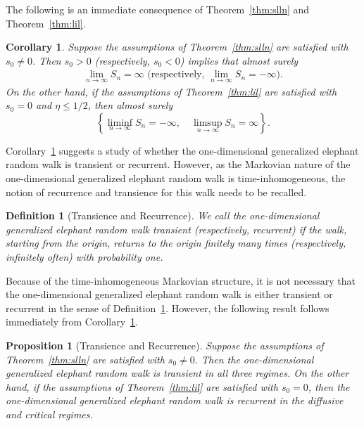 \documentclass[12pt]{amsart}
\theoremstyle{plain}
\newtheorem{corollary}[theorem]{Corollary}
\newtheorem{proposition}[theorem]{Proposition}
\newtheorem{definition}[theorem]{Definition}
\theoremstyle{remark}
\numberwithin{equation}{section}
\begin{document}
The following is an immediate consequence of Theorem~\ref{thm:slln} and Theorem~\ref{thm:lil}.

\begin{corollary}\label{cor:rec}
Suppose the assumptions of Theorem~\ref{thm:slln} are satisfied with $s_0 \neq 0$. Then $s_0 > 0$ (respectively, $s_0 < 0$) implies that almost surely 
\begin{align*}
\lim_{n\to\infty} S_n = \infty \text{ (respectively, }\lim_{n\to\infty} S_n = -\infty). 
\end{align*}
On the other hand, if the assumptions of Theorem~\ref{thm:lil} are satisfied with $s_0 = 0$ and $\eta \leq 1/2$, then almost surely
\[
      \left\{ \liminf_{n\to\infty} S_n = - \infty, \quad \limsup_{n\to\infty} S_n = \infty\right\}.
\]
\end{corollary}

Corollary~\ref{cor:rec} suggests a study of whether the one-dimensional generalized elephant random walk is transient or recurrent. However, as the Markovian nature of the one-dimensional generalized elephant random walk is time-inhomogeneous, the notion of recurrence and transience for this walk needs to be recalled.

\begin{definition}[Transience and Recurrence]\label{def:trrec}
    We call the one-dimensional generalized elephant random walk transient (respectively, recurrent) if the walk, starting from the origin, returns to the origin finitely many times (respectively, infinitely often) with probability one.  
\end{definition}

Because of the time-inhomogeneous Markovian structure, it is not necessary that the one-dimensional generalized elephant random walk is either transient or recurrent in the sense of Definition~\ref{def:trrec}. However, the following result follows immediately from Corollary~\ref{cor:rec}.

\begin{proposition}[Transience and Recurrence]\label{prop:tra-rec}
    Suppose the assumptions of Theorem~\ref{thm:slln} are satisfied with $s_0 \neq 0$. Then the one-dimensional generalized elephant random walk is transient in all three regimes. On the other hand, if the assumptions of Theorem~\ref{thm:lil} are satisfied with $s_0 = 0$, then the one-dimensional generalized elephant random walk is recurrent in the diffusive and critical regimes.
\end{proposition}
\end{document}
